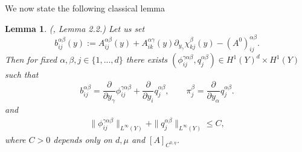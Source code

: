 \documentclass[11pt, reqno]{amsart}
\newtheorem{lemma}[theorem]{Lemma}
\theoremstyle{definition}
\theoremstyle{remark}
\numberwithin{equation}{section}
\begin{document}
	
		\noindent	We now state the following classical lemma
	\begin{lemma}\label{divphi} \textup{ (\cite{GZ}, Lemma 2.2.)}
		Let us set 
		\begin{equation*}
			b^{\alpha\beta}_{ij}(y):= A^{\alpha\beta}_{ij} (y) +  A^{\alpha\gamma}_{ik} (y)\partial_{y_\gamma}\chi ^{\beta}_{kj}(y) -  (A^ 0)^{\alpha\beta}_{ij}.
		\end{equation*}
		Then 
		for fixed $\alpha,\beta,j \in \{1,...,d\}$  there exists $(\phi^{\gamma\alpha\beta}_{ij} , q^{\alpha\beta}_{j}) \in H^1 (Y)^d\times H^1(Y)$ such that 
		\begin{equation*}
			b^{\alpha\beta}_{ij}= \frac{\partial}{\partial y_\gamma}\phi^{\gamma\alpha\beta}_{ij} + \frac{\partial}{\partial y_i}q^{\alpha\beta}_{j},\qquad 	\pi^{\beta}_{j}=\frac{\partial}{\partial y_\alpha}q^{\alpha\beta}_{j}.
		\end{equation*}
		and
		\begin{align*}
			\| \phi^{\gamma\alpha\beta}_{ij} \|_{L^\infty(Y)} + \| q^{\alpha\beta}_{j} \|_{L^\infty(Y)} \leq C,
		\end{align*}
		where $C>0$ depends only on $d, \mu$ and $[A]_{C^{0,\eta}}$.
	\end{lemma}
\end{document}
